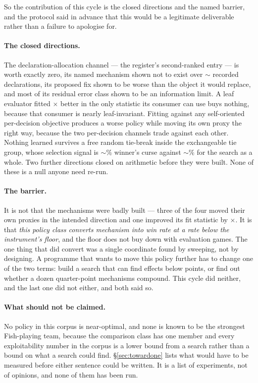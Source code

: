 So the contribution of this cycle is the closed directions and the named barrier, and the protocol
said in advance that this would be a legitimate deliverable rather than a failure to apologise for.

\paragraph{The closed directions.} The declaration-allocation channel --- the register's second-ranked
entry --- is worth exactly zero, its named mechanism shown not to exist over
$\sim$\vsevenLoneDecls{} recorded declarations, its proposed fix shown to be worse than the object it
would replace, and most of its residual error class shown to be an information limit. A leaf evaluator
fitted \vsevenKoneFold$\times$ better in the only statistic its consumer can use buys nothing, because
that consumer is nearly leaf-invariant. Fitting against any self-oriented per-decision objective
produces a worse policy while moving its own proxy the right way, because the two per-decision channels
trade against each other. Nothing learned survives a free random tie-break inside the exchangeable tie
group, whose selection signal is $\sim$\vsevenCurseTieShare\% winner's curse against
$\sim$\vsevenCurseShare\% for the search as a whole. Two further directions
closed on arithmetic before they were built. None of these is a null anyone need re-run.

\paragraph{The barrier.} It is not that the mechanisms were badly built --- three of the four moved
their own proxies in the intended direction and one improved its fit statistic by
\vsevenKoneFold$\times$. It is that \emph{this policy class converts mechanism into win rate at a rate below the
instrument's floor}, and the floor does not buy down with evaluation games. The one thing that did
convert was a single coordinate found by sweeping, not by designing. A programme that wants to move
this policy further has to change one of the two terms: build a search that can find effects below
\vsevenPrimaryFloor{} points, or find out whether a dozen quarter-point mechanisms compound. This cycle
did neither, and the last one did not either, and both said so.

\paragraph{What should not be claimed.} No policy in this corpus is near-optimal, and none is known to
be the strongest Fish-playing team, because the comparison class has one member and every
exploitability number in the corpus is a lower bound from a search rather than a bound on what a search
could find. \S\ref{sec:towardone} lists what would have to be measured before either sentence could be
written. It is a list of experiments, not of opinions, and none of them has been run.
